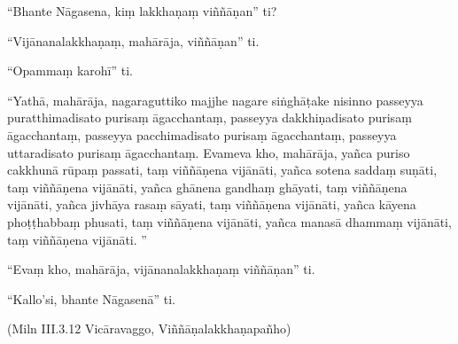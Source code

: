 “Bhante Nāgasena, kiṃ lakkhaṇaṃ viññāṇan” ti?

“Vijānanalakkhaṇaṃ, mahārāja, viññāṇan” ti.

“Opammaṃ karohī” ti.

“Yathā, mahārāja, nagaraguttiko majjhe nagare siṅghāṭake nisinno passeyya puratthimadisato purisaṃ āgacchantaṃ, passeyya dakkhiṇadisato purisaṃ āgacchantaṃ, passeyya pacchimadisato purisaṃ āgacchantaṃ, passeyya uttaradisato purisaṃ āgacchantaṃ. Evameva kho, mahārāja, yañca puriso cakkhunā rūpaṃ passati, taṃ viññāṇena vijānāti, yañca sotena saddaṃ suṇāti, taṃ viññāṇena vijānāti, yañca ghānena gandhaṃ ghāyati, taṃ viññāṇena vijānāti, yañca jivhāya rasaṃ sāyati, taṃ viññāṇena vijānāti, yañca kāyena phoṭṭhabbaṃ phusati, taṃ viññāṇena vijānāti, yañca manasā dhammaṃ vijānāti, taṃ viññāṇena vijānāti. ”

“Evaṃ kho, mahārāja, vijānanalakkhaṇaṃ viññāṇan” ti.

“Kallo’si, bhante Nāgasenā” ti.

(Miln III.3.12 Vicāravaggo, Viññāṇalakkhaṇapañho)